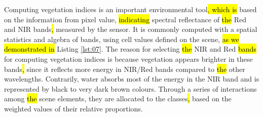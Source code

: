 \documentclass[jimaging,article,submit,pdftex,moreauthors]{Definitions/mdpi}
\begin{document}
Computing vegetation indices is an important environmental tool\hl{, which is }based on the information from pixel value, \hl{indicating} spectral reflectance of \hl{the} Red and NIR bands\hl{,} measured by the sensor. It is commonly computed with a spatial statistics and algebra of bands, using cell values defined on the scene, \hl{as we demonstrated in} Listing \ref{lst:07}. The reason for selecting \hl{the} NIR and Red \hl{bands} for computing\hl{ }vegetation indices is because\hl{ }vegetation appears brighter in these bands\hl{, }since it reflects more energy in NIR/Red bands compared to \hl{the} other wavelengths. Contrarily, water absorbs most of the energy in the NIR band and is represented by black to very dark brown colours. Through a series of interactions among \hl{the} scene elements, they are allocated to the classes\hl{,} based on the weighted values of their relative proportions.
\end{document}
